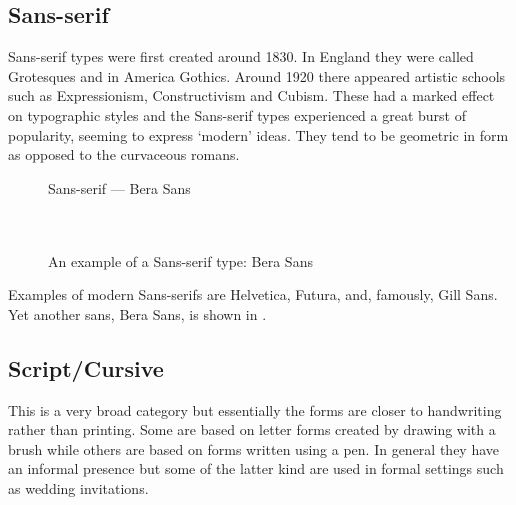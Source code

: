 \documentclass[10pt,a4paper,extrafontsizes]{memoir}
\begin{document}
\subsection{Sans-serif}

\begin{paracol}{2}
\switchEng
    Sans-serif types were first created around 1830. In England they were
called Grotesques and in America Gothics. 
Around 1920 there appeared artistic
schools such as Expressionism, Constructivism and Cubism. These had a
marked effect on typographic styles and the Sans-serif types experienced
a great burst of popularity, seeming to express `modern' ideas. They tend to
be geometric in form as opposed to the curvaceous romans.
\end{paracol}

\begin{figure}
\centering
{\centering{}\selectfont
  Sans-serif --- Bera Sans \\
  \UCalphabet \\
  \LCalphabet \\
  \fox\par}
\caption{An example of a Sans-serif type: Bera Sans} 
   \label{fig:berasans}
\end{figure}

\begin{paracol}{2}
\switchEng
    Examples of modern Sans-serifs are 
Helvetica, 
Futura,
and, famously, Gill Sans. 
Yet another sans, 
Bera Sans\facesubseeidx{Bera Sans}, is shown in .
\end{paracol}

\subsection{Script/Cursive}

\begin{paracol}{2}
\switchEng
    This is a very broad category but 
essentially the forms are closer
to handwriting rather than printing. Some are based on letter forms created
by drawing with a brush while others are based on forms written using
a pen. In general they have an informal
presence but some of the latter kind are used in formal settings such 
as wedding invitations.
\end{paracol}
\end{document}
